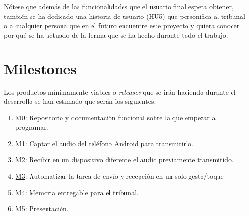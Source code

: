 Nótese que además de las funcionalidades que el usuario final espera obtener,
también se ha dedicado una historia de usuario (HU5) que personifica al tribunal o
a cualquier persona que en el futuro encuentre este proyecto y quiera conocer
por qué se ha actuado de la forma que se ha hecho durante todo el trabajo.

\section{Milestones}
Los productos mínimamente viables o \emph{releases} que se irán haciendo durante el
desarrollo se han estimado que serán los siguientes:

\begin{enumerate}
    \item \href{https://github.com/migueorg/One-touch-music-streaming-TFG-ETSIIT/milestone/1}{M0}: Repositorio y documentación funcional sobre la que empezar a programar.
    \item \href{https://github.com/migueorg/One-touch-music-streaming-TFG-ETSIIT/milestone/2}{M1}: Captar el audio del teléfono Android para transmitirlo.
    \item \href{https://github.com/migueorg/One-touch-music-streaming-TFG-ETSIIT/milestone/3}{M2}: Recibir en un dispositivo diferente el audio previamente transmitido.
    \item \href{https://github.com/migueorg/One-touch-music-streaming-TFG-ETSIIT/milestone/4}{M3}: Automatizar la tarea de envío y recepción en un solo gesto/toque
    \item \href{https://github.com/migueorg/One-touch-music-streaming-TFG-ETSIIT/milestone/5}{M4}: Memoria entregable para el tribunal.
    \item \href{https://github.com/migueorg/One-touch-music-streaming-TFG-ETSIIT/milestone/6}{M5}: Presentación.
\end{enumerate}